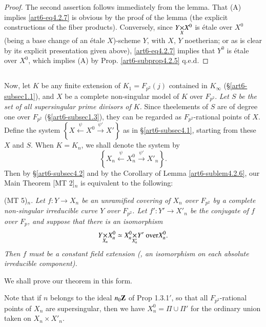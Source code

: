 \begin{proof}
The second assertion follows immediately from the lemma. That (A) implies \eqref{art6-eq4.2.7} is obvious by the proof of the lemma (the explicit constructions of the fiber products). Conversely, since $\fprod{Y}{X^0}{X}$ is \'etale over $X^0$ (being a base change of an \'etale $X$)-scheme $Y$, with $X$, $Y$ noetherian; or as is clear by its explicit presentation given above), \eqref{art6-eq4.2.7} implies that $Y^0$ is \'etale over $X^0$, which implies (A) by Prop. \ref{art6-subprop4.2.5} q.e.d.
\end{proof}

\subsection{}\label{art6-subsec4.3}
Now, let $K$ be any finite extension of $K_1 = F_{p^2} (j)$ contained in $K_\infty$ (\S \ref{art6-subsec1.1}), and $X$ be a complete non-singular model of $K$ over $F_{p^2}$. \textit{Let $S$ be the set of all supersingular prime divisors of $K$.} Since the\pageoriginale elements of $S$ are of degree one over $F_{p^2}$ (\S \eqref{art6-subsec1.3}), they can be regarded as $F_{p^2}$-rational points of $X$. Define the system $\left\{X \xleftarrow{\psi} X^0 \xrightarrow{\psi'} X' \right\}$ as in \S \eqref{art6-subsec4.1}, starting from these $X$ and $S$. When $K= K_n$, we shall denote the system by
\begin{equation}
\left\{X_n \xleftarrow{\psi} X^0_n \xrightarrow{\psi'} X'_n \right\}.
\label{art6-eq4.3.1}
\end{equation}
Then by \S \ref{art6-subsec4.2} and by the Corollary of Lemma \ref{art6-sublem4.2.6}, our Main Theorem [MT 2]$_n$ is equivalent to the following:

(MT 5)$_n$. \textit{Let $f: Y \to X_n$ be an unramified covering of $X_n$ over $F_{p^2}$ by a complete non-singular irreducible curve $Y$ over $F_{p^2}$. Let $f' : Y' \to X'_n$ be the conjugate of $f$ over $F_p$, and suppose that there is an isomorphism}
\begin{equation}
\fprod{Y}{X^0_n}{X_n} \simeq \fprod{X^0_n}{Y'}{X'_n} \text{ over} X^0_n. \label{art6-eq4.3.2}
\end{equation}
\textit{Then $f$ must be a constant field extension (\ie, an isomorphism on each absolute irreducible component).}

We shall prove our theorem in this form.

Note that if $n$ belongs to the ideal $n_0 \mathbf{Z}$ of Prop 1.3.1$'$, so that all $F_{p^2}$-rational points of $X_n$ are supersingular, then we have $X^0_n = \Pi \cup \Pi'$ 
for the ordinary union taken on $X_n \times X'_n$.

